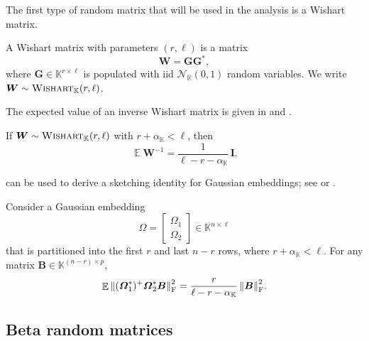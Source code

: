 \documentclass[11pt]{article}
\newcommand{\field}{\mathbb{K}}
\newcommand{\mat}[1]{\boldsymbol{#1}}
\newcommand{\norm}[1]{\mleft\| #1 \mright\|}
\newcommand{\Id}{\mathbf{I}}
\newcommand{\twobyone}[2]{%
  \begin{bmatrix}#1 \\ #2\end{bmatrix}}
\DeclareMathOperator{\expect}{\mathbb{E}}
\newcommand{\Wishart}{\textnormal{\textsc{Wishart}}}
\theoremstyle{definition}
\numberwithin{equation}{section}
\begin{document}
The first type of random matrix that will be used in the analysis is a Wishart matrix.

\begin{definition}
    A Wishart matrix with parameters $(r, \ell)$ is a matrix
    \begin{equation*}
    \mat{W} = \mat{G}\mat{G}^*,
    \end{equation*}
    where $\mat{G} \in \field^{r \times \ell}$ is populated with iid $\mathcal{N}_\field(0,1)$ random variables.
    We write $\mat{W} \sim \Wishart_\field(r,\ell)$.
\end{definition}

\noindent The expected value of an inverse Wishart matrix is given in \cite{Sha80} and \cite[p.~97]{Mui82}.

\begin{fact} \label{fact:wishart}
    If $\mat{W} \sim \Wishart_\field(r,\ell)$ with $r + \alpha_{\field} < \ell$, then
    \begin{equation*}
    \expect\mat{W}^{-1} = \frac{1}{\ell - r - \alpha_\field} \,\Id.
    \end{equation*}
\end{fact}

\noindent {} can be used to derive a sketching identity for Gaussian embeddings; see \cite[Prop.~10.1 \& 10.2]{HMT11} or \cite[Prop.~8.6]{TW23a}.

\begin{proposition} \label{prop:gaussian-sketch}
    Consider a Gaussian embedding \begin{equation*}
    \mat{\varOmega} = \twobyone{\mat{\varOmega}_1}{\mat{\varOmega}_2} \in \field^{n \times \ell}
    \end{equation*}
    that is partitioned into the first $r$ and last $n-r$ rows, where $r + \alpha_{\field} < \ell$.
    For any matrix $\mat{B} \in \field^{(n-r) \times p}$,
    \begin{equation*}
        \expect\, \norm{\smash{(\mat{\varOmega}_1^*)^+ \mat{\varOmega}_2^* \mat{B} }}_{\rm F}^2 = \frac{r}{\ell - r - \alpha_\field} \, \norm{\mat{B}}_{\rm F}^2.
    \end{equation*}
\end{proposition}

\subsection{Beta random matrices} \label{sec:beta}
\end{document}
